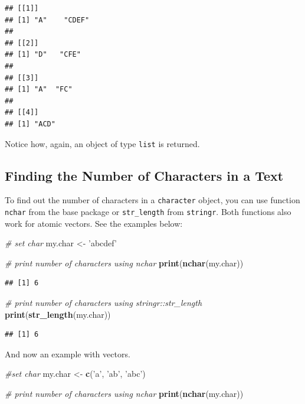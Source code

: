 \documentclass[11pt,]{book}
\newenvironment{Shaded}{\begin{snugshade}}{\end{snugshade}}
\newcommand{\KeywordTok}[1]{\textcolor[rgb]{0.27,0.27,0.27}{\textbf{#1}}}
\newcommand{\StringTok}[1]{\textcolor[rgb]{0.5,0.5,0.5}{#1}}
\newcommand{\CommentTok}[1]{\textcolor[rgb]{0.56,0.35,0.01}{\textit{#1}}}
\newcommand{\NormalTok}[1]{#1}
\begin{document}
\begin{verbatim}
## [[1]]
## [1] "A"    "CDEF"
## 
## [[2]]
## [1] "D"   "CFE"
## 
## [[3]]
## [1] "A"  "FC"
## 
## [[4]]
## [1] "ACD"
\end{verbatim}

Notice how, again, an object of type \texttt{list} is returned.

\subsection{Finding the Number of Characters in a
Text}\label{finding-the-number-of-characters-in-a-text}

To find out the number of characters in a \texttt{character} object, you
can use function \texttt{nchar} from the base package or
\texttt{str\_length} from \texttt{stringr}. Both functions also work for
atomic vectors. See the examples below: 

\begin{Shaded}
\begin{Highlighting}[]
\CommentTok{# set char}
\NormalTok{my.char <-}\StringTok{ 'abcdef'}

\CommentTok{# print number of characters using nchar}
\KeywordTok{print}\NormalTok{(}\KeywordTok{nchar}\NormalTok{(my.char))}
\end{Highlighting}
\end{Shaded}

\begin{verbatim}
## [1] 6
\end{verbatim}

\begin{Shaded}
\begin{Highlighting}[]
\CommentTok{# print number of characters using stringr::str_length}
\KeywordTok{print}\NormalTok{(}\KeywordTok{str_length}\NormalTok{(my.char))}
\end{Highlighting}
\end{Shaded}

\begin{verbatim}
## [1] 6
\end{verbatim}

And now an example with vectors.

\begin{Shaded}
\begin{Highlighting}[]
\CommentTok{#set char}
\NormalTok{my.char <-}\StringTok{ }\KeywordTok{c}\NormalTok{(}\StringTok{'a'}\NormalTok{, }\StringTok{'ab'}\NormalTok{, }\StringTok{'abc'}\NormalTok{)}

\CommentTok{# print number of characters using nchar}
\KeywordTok{print}\NormalTok{(}\KeywordTok{nchar}\NormalTok{(my.char))}
\end{Highlighting}
\end{Shaded}
\end{document}

